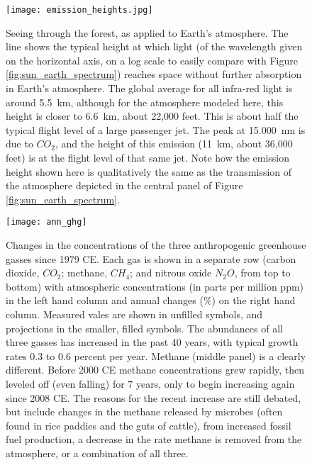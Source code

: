 \begin{figure}[p]
\centering
\texttt{[image: emission\_heights.jpg]}%
\caption{Seeing through the forest, as applied to Earth's atmosphere. The line shows the typical height at which light (of the wavelength given on the horizontal axis, on a log scale to easily compare with Figure \ref{fig:sun_earth_spectrum}) reaches space without further absorption in Earth's atmosphere. The global average for all infra-red light is around \SI{5.5}{\kilo\metre}, although for the atmosphere modeled here, this height is closer to \SI{6.6}{\kilo\metre}, about 22,000 feet. This is about half the typical flight level of a large passenger jet. The peak at \SI{15,000}{\nano\metre} is due to $CO_2$, and the height of this emission (\SI{11}{\kilo\metre}, about 36,000 feet) is at the flight level of that same jet. Note how the emission height shown here is qualitatively the same as the transmission of the atmosphere depicted in the central panel of Figure \ref{fig:sun_earth_spectrum}.}   
\label{fig:emission_heights}
\end{figure}

\newpage
\begin{sidewaysfigure}
\centering
\texttt{[image: ann\_ghg]}%
\caption{Changes in the concentrations of the three anthropogenic greenhouse gasses since 1979 CE. Each gas is shown in a separate row (carbon dioxide, $CO_2$; methane, $CH_4$; and nitrous oxide $N_2O$, from top to bottom) with atmospheric concentrations (in parts per million ppm) in the left hand column and annual changes (\%) on the right hand column. Measured vales are shown in unfilled symbols, and projections in the smaller, filled symbols. The abundances of all three gasses has increased in the past 40 years, with typical growth rates 0.3 to 0.6 percent per year. Methane (middle panel) is a clearly different. Before 2000 CE methane concentrations grew rapidly, then leveled off (even falling) for 7 years, only to begin increasing again since 2008 CE. The reasons for the recent increase are still debated, but include changes in the methane released by microbes (often found in rice paddies and the guts of cattle), from increased fossil fuel production, a decrease in the rate methane is removed from the atmosphere, or a combination of all three. }
\label{fig:annghg}
\end{sidewaysfigure}

